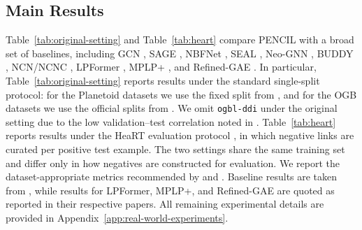 \documentclass{article}
\theoremstyle{plain}
\theoremstyle{definition}
\theoremstyle{remark}
\begin{document}
\subsection{Main Results}
Table~\ref{tab:original-setting} and Table~\ref{tab:heart} compare PENCIL with a broad set of baselines, including GCN \cite{kipf2017semisupervised}, SAGE \cite{hamilton2017inductive}, NBFNet \cite{zhu_neural_bellman-ford_2021}, SEAL \cite{zhang_link_2018}, Neo-GNN \cite{yun_neo-gnns_2021}, BUDDY \cite{chamberlain2023graph}, NCN/NCNC \cite{wang2024neural}, LPFormer \cite{shomer_lpformer_2024}, MPLP+ \cite{dong_pure_2024}, and Refined-GAE \cite{ma_reconsidering_2025}. In particular, Table~\ref{tab:original-setting} reports results under the standard single-split protocol: for the Planetoid datasets we use the fixed split from \cite{li_evaluating_2023}, and for the OGB datasets we use the official splits from \cite{hu2020ogb}. We omit \texttt{ogbl-ddi} under the original setting due to the low validation--test correlation noted in \cite{li_evaluating_2023,shomer_lpformer_2024}. Table~\ref{tab:heart} reports results under the HeaRT evaluation protocol \cite{li_evaluating_2023}, in which negative links are curated per positive test example. The two settings share the same training set and differ only in how negatives are constructed for evaluation. We report the dataset-appropriate metrics recommended by \cite{li_evaluating_2023} and \cite{hu2020ogb}. Baseline results are taken from \cite{li_evaluating_2023}, while results for LPFormer, MPLP+, and Refined-GAE are quoted as reported in their respective papers. All remaining experimental details are provided in Appendix~\ref{app:real-world-experiments}.
\end{document}
